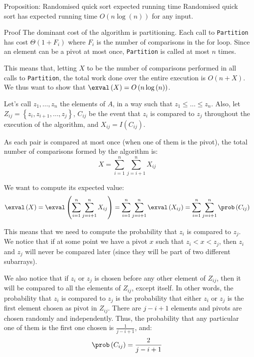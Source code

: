 \documentclass[a4paper]{article}
\begin{document}
\begin{parag}{Proposition: Randomised quick sort expected running time}
    Randomised quick sort has expected running time $O\left(n \log\left(n\right)\right)$ for any input.

    \begin{subparag}{Proof}
        The dominant cost of the algorithm is partitioning. Each call to \texttt{Partition} has cost $\Theta\left(1 + F_i\right)$ where $F_i$ is the number of comparisons in the for loop. Since an element can be a pivot at most once, \texttt{Partition} is called at most $n$ times. 

        This means that, letting $X$ to be the number of comparisons performed in all calls to \texttt{Partition}, the total work done over the entire execution is $O\left(n + X\right)$. We thus want to show that $\exval\left(X\right) = O\left(n\log\left(n\right)\right)$.

        Let's call $z_1, \ldots, z_n$ the elements of $A$, in a way such that $z_1 \leq \ldots \leq z_n$. Also, let $Z_{ij} = \left\{z_i, z_{i+1}, \ldots, z_j\right\}$, $C_{ij}$ be the event that $z_i$ is compared to $z_j$ throughout the execution of the algorithm, and $X_{ij} = I\left(C_{ij}\right)$. 

        As each pair is compared at most once (when one of them is the pivot), the total number of comparisons formed by the algorithm is: 
        \[X = \sum_{i=1}^{n} \sum_{j=i+1}^{n} X_{ij}\]
        
        We want to compute its expected value: 
        \[\exval\left(X\right) = \exval\left(\sum_{i=1}^{n} \sum_{j=i+1}^{n} X_{ij}\right) = \sum_{i=1}^{n} \sum_{j=i+1}^{n} \exval\left(X_{ij}\right) = \sum_{i=1}^{n} \sum_{j=i+1}^{n} \prob\left(C_{ij}\right)\]

        This means that we need to compute the probability that $z_i$ is compared to $z_j$. We notice that if at some point we have a pivot $x$ such that $z_i < x < z_j$, then $z_i$ and $z_j$ will never be compared later (since they will be part of two different subarrays).

        We also notice that if $z_i$ or $z_j$ is chosen before any other element of $Z_{ij}$, then it will be compared to all the elements of $Z_{ij}$, except itself. In other words, the probability that $z_i$ is compared to $z_j$ is the probability that either $z_i$ or $z_j$ is the first element chosen as pivot in $Z_{ij}$. There are $j-i+1$ elements and pivots are chosen randomly and independently. Thus, the probability that any particular one of them is the first one chosen is $\frac{1}{j-i+1}$, and: 
        \[\prob\left(C_{ij}\right) = \frac{2}{j - i + 1}\]
        

\end{subparag}
\end{parag}
\end{document}
